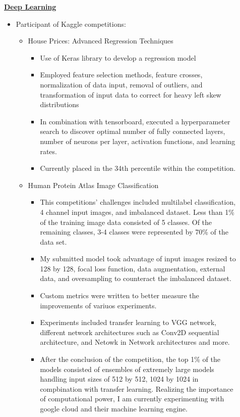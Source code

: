 \documentclass[11pt]{ltxdoc}
\begin{document}
\begin{description}
    \item[] \textbf{\underline{Deep Learning}}
      \begin{itemize}
        \item Participant of Kaggle competitions:
        	\begin{itemize}
        	  \item House Prices: Advanced Regression Techniques
        	    \begin{itemize}
        	      \item Use of Keras library to develop a regression model
        	      \item Employed feature selection methods, feature crosses, normalization of data input, removal of outliers, and transformation of input data to correct for heavy left skew distributions
        	      \item In combination with tensorboard, executed a hyperparameter search to discover optimal number of fully connected layers, number of neurons per layer, activation functions, and learning rates.
        	      \item Currently placed in the 34th percentile within the competition.
        	    \end{itemize}
        	  \item Human Protein Atlas Image Classification
        	    \begin{itemize}
        	      \item This competitions' challenges included multilabel classification, 4 channel input images, and imbalanced dataset. Less than 1\% of the training image data consisted of 5 classes. Of the remaining classes, 3-4 classes were represented by 70\% of the data set.
        	      \item My submitted model took advantage of input images resized to 128 by 128, focal loss function, data augmentation, external data, and oversampling to counteract the imbalanced dataset. 
        	      \item Custom metrics were written to better measure the improvements of variuos experiments.
        	      \item Experiments included transfer learning to VGG network, different network architectures such as Conv2D sequential architecture, and Netowk in Network architectures and more.
        	      \item After the conclusion of the competition, the top 1\% of the models consisted of ensembles of extremely large models handling input sizes of 512 by 512, 1024 by 1024 in compbination with transfer learning. Realizing the importance of computational power, I am currently experimenting with google cloud and their machine learning engine.

\end{itemize}
\end{itemize}
\end{itemize}
\end{description}
\end{document}
